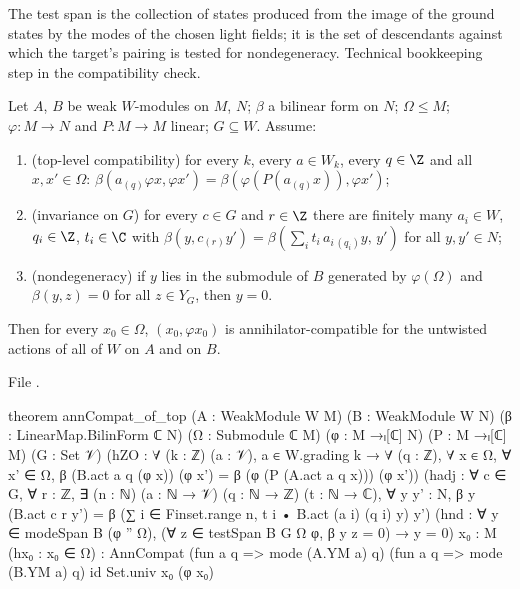 \begin{physics}
The test span is the collection of states produced from the image of the ground states by the modes of the chosen light fields; it is the set of descendants against which the target's pairing is tested for nondegeneracy. Technical bookkeeping step in the compatibility check.
\end{physics}

\begin{theorem}\label{ch12:thm:annCompat_of_top}
Let $A$, $B$ be weak $W$-modules on $M$, $N$; $\beta$ a bilinear form on $N$; $\Omega\le M$;
$\varphi:M\to N$ and $P:M\to M$ linear; $G\subseteq W$.  Assume:
\begin{enumerate}[label=(\roman*)]
\item (top-level compatibility) for every $k$, every $a\in W_k$, every $q\in\Z$ and all
  $x,x'\in\Omega$: $\beta(a_{(q)}\varphi x,\varphi x') = \beta(\varphi(P(a_{(q)}x)),\varphi x')$;
\item (invariance on $G$) for every $c\in G$ and $r\in\Z$ there are finitely many $a_i\in W$, $q_i\in\Z$,
  $t_i\in\C$ with $\beta(y,c_{(r)}y')=\beta(\sum_i t_i\,a_{i\,(q_i)}y,\,y')$ for all $y,y'\in N$;
\item (nondegeneracy) if $y$ lies in the submodule of $B$ generated by $\varphi(\Omega)$ and
  $\beta(y,z)=0$ for all $z\in Y_G$, then $y=0$.
\end{enumerate}
Then for every $x_0\in\Omega$, $(x_0,\varphi x_0)$ is annihilator-compatible for the untwisted
actions of all of $W$ on $A$ and on $B$.
\end{theorem}
File .
\begin{leancode}
theorem annCompat_of_top (A : WeakModule W M) (B : WeakModule W N)
    (β : LinearMap.BilinForm ℂ N) (Ω : Submodule ℂ M) (φ : M →ₗ[ℂ] N) (P : M →ₗ[ℂ] M)
    (G : Set 𝒱)
    (hZO : ∀ (k : ℤ) (a : 𝒱), a ∈ W.grading k → ∀ (q : ℤ), ∀ x ∈ Ω, ∀ x' ∈ Ω,
      β (B.act a q (φ x)) (φ x') = β (φ (P (A.act a q x))) (φ x'))
    (hadj : ∀ c ∈ G, ∀ r : ℤ, ∃ (n : ℕ) (a : ℕ → 𝒱) (q : ℕ → ℤ) (t : ℕ → ℂ), ∀ y y' : N,
      β y (B.act c r y') = β (∑ i ∈ Finset.range n, t i • B.act (a i) (q i) y) y')
    (hnd : ∀ y ∈ modeSpan B (φ '' Ω), (∀ z ∈ testSpan B G Ω φ, β y z = 0) → y = 0)
    {x₀ : M} (hx₀ : x₀ ∈ Ω) :
    AnnCompat (fun a q => mode (A.YM a) q) (fun a q => mode (B.YM a) q) id Set.univ x₀ (φ x₀)
\end{leancode}
